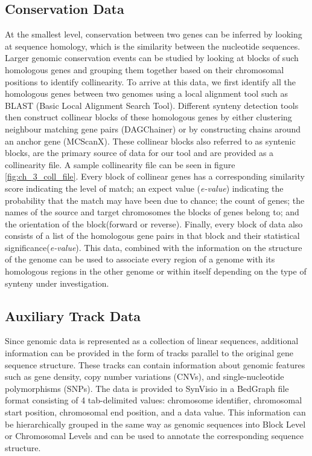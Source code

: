 \subsection{Conservation Data}
At the smallest level, conservation between two genes can be inferred by looking at sequence homology, which is the similarity between the nucleotide sequences. Larger genomic conservation events can be studied by looking at blocks of such homologous genes and grouping them together based on their chromosomal positions to identify collinearity. To arrive at this data, we first identify all the homologous genes between two genomes using a local alignment tool such as BLAST (Basic Local Alignment Search Tool)\cite{blasttool}. Different synteny detection tools then construct collinear blocks of these homologous genes by either clustering neighbour matching gene pairs (DAGChainer) \cite{haas2004dagchainer} or by constructing chains around an anchor gene (MCScanX)\cite{wang2012mcscanx}. These collinear blocks also referred to as syntenic blocks, are the primary source of data for our tool and are provided as a collinearity file. A sample collinearity file can be seen in figure \ref{fig:ch_3_coll_file}. Every block of collinear genes has a corresponding similarity score indicating the level of match; an expect value (\textit{e-value}) indicating the probability that the match may have been due to chance; the count of genes; the names of the source and target chromosomes the blocks of genes belong to; and the orientation of the block(forward or reverse). Finally, every block of data also consists of a list of the homologous gene pairs in that block and their statistical significance(\textit{e-value}). This data, combined with the information on the structure of the genome can be used to associate every region of a genome with its homologous regions in the other genome or within itself depending on the type of synteny under investigation.

\subsection{Auxiliary Track Data}
Since genomic data is represented as a collection of linear sequences, additional information can be provided in the form of tracks parallel to the original gene sequence structure. These tracks can contain information about genomic features such as gene density, copy number variations (CNVs), and single-nucleotide polymorphisms (SNPs). The data is provided to SynVisio in a BedGraph file format consisting of 4 tab-delimited values: chromosome identifier, chromosomal start position, chromosomal end position, and a data value. This information can be hierarchically grouped in the same way as genomic sequences into Block Level or Chromosomal Levels and can be used to annotate the corresponding sequence structure. 



